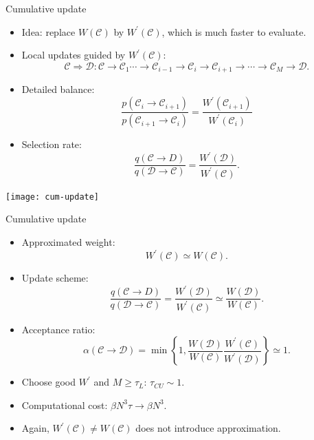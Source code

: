 \documentclass[xcolor=table, 10pt, aspectratio=43]{beamer}
\begin{document}
\begin{frame}{Cumulative update}
  \begin{itemize}
    \item Idea: replace $W(\mathcal C)$ by $W^\prime(\mathcal C)$, which is much faster to evaluate.
    \item Local updates guided by $W^\prime(\mathcal C)$:
    \[\mathcal C\Rightarrow\mathcal D:
    \mathcal C\rightarrow\mathcal C_1\cdots\rightarrow\mathcal C_{i-1}\rightarrow\mathcal C_i\rightarrow\mathcal C_{i+1}\rightarrow\cdots\rightarrow\mathcal C_M\rightarrow\mathcal D.\]
    \item Detailed balance:
    \[\frac{p(\mathcal C_i\rightarrow\mathcal C_{i+1})}{p(\mathcal C_{i+1}\rightarrow\mathcal C_i)}=\frac{W^\prime(\mathcal C_{i+1})}{W^\prime(\mathcal C_i)}\]
    \item Selection rate:
    \[\frac{q(\mathcal C\rightarrow D)}
    {q(\mathcal D\rightarrow\mathcal C)}
    =\frac{W^\prime(\mathcal D)}{W^\prime(\mathcal C)}.\]
  \end{itemize}
	\begin{center}
		\texttt{[image: cum-update]}
	\end{center}
\end{frame}

\begin{frame}{Cumulative update}
  \begin{itemize}
    \item Approximated weight:
    \[W^\prime(\mathcal C)\simeq W(\mathcal C).\]
    \item Update scheme:
    \[\frac{q(\mathcal C\rightarrow D)}
    {q(\mathcal D\rightarrow\mathcal C)}
    =\frac{W^\prime(\mathcal D)}{W^\prime(\mathcal C)}
    \simeq\frac{W(\mathcal D)}{W(\mathcal C)}.\]
    \item Acceptance ratio:
    \[\alpha(\mathcal C\rightarrow \mathcal D)=\min\left\{1, \frac{W(\mathcal D)}{W(\mathcal C)}
    \frac{W^\prime(\mathcal C)}{W^\prime(\mathcal D)}\right\}\simeq1.\]
    \item Choose good $W^\prime$ and $M\geq\tau_L$: $\tau_{CU}\sim1$.
    \item Computational cost: $\beta N^3\tau\rightarrow \beta N^3$.
    \item Again, $W^\prime(\mathcal C)\neq W(\mathcal C)$ does not introduce approximation.
  \end{itemize}
\end{frame}
\end{document}
